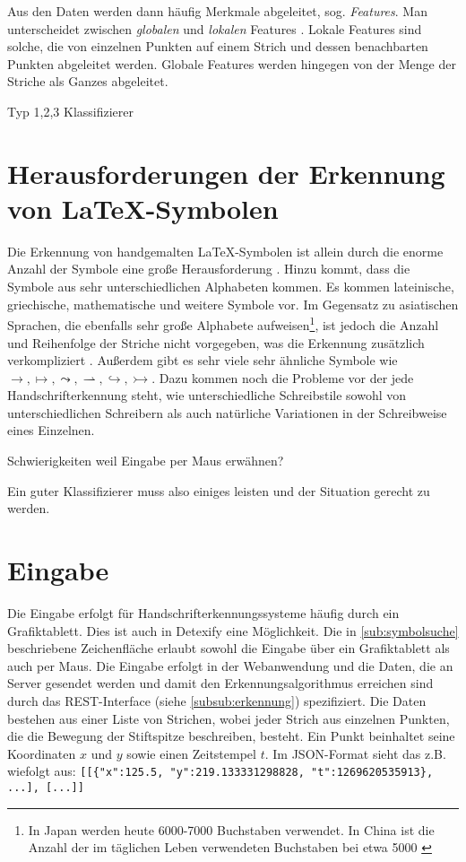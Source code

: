 Aus den Daten werden dann häufig Merkmale abgeleitet, sog. \emph{Features}. Man unterscheidet zwischen \emph{globalen} und \emph{lokalen} Features \cite{Tapia:2007p9160}. Lokale Features sind solche, die von einzelnen Punkten auf einem Strich und dessen benachbarten Punkten abgeleitet werden. Globale Features werden hingegen von der Menge der Striche als Ganzes abgeleitet.

\TODO Typ 1,2,3 Klassifizierer

\section[Herausforderungen]{Herausforderungen der Erkennung von \LaTeX-Symbolen}
Die Erkennung von handgemalten \LaTeX-Symbolen ist allein durch die enorme Anzahl der Symbole eine große Herausforderung \cite{Koerich:2003p1562}. Hinzu kommt, dass die Symbole aus sehr unterschiedlichen Alphabeten kommen. Es kommen lateinische, griechische, mathematische und weitere Symbole vor. Im Gegensatz zu asiatischen Sprachen, die ebenfalls sehr große Alphabete aufweisen\footnote{In Japan werden heute 6000-7000 Buchstaben verwendet. In China ist die Anzahl der im täglichen Leben verwendeten Buchstaben bei etwa 5000 \cite{Jaeger:2003p1097}}, ist jedoch die Anzahl und Reihenfolge der Striche nicht vorgegeben, was die Erkennung zusätzlich verkompliziert \cite{Watt:2005p1816}. Außerdem gibt es sehr viele sehr ähnliche Symbole wie $\rightarrow,\mapsto,\leadsto,\rightharpoonup,\hookrightarrow,\rightarrowtail$. Dazu kommen noch die Probleme vor der jede Handschrifterkennung steht, wie unterschiedliche Schreibstile sowohl von unterschiedlichen Schreibern als auch natürliche Variationen in der Schreibweise eines Einzelnen.

\TODO Schwierigkeiten weil Eingabe per Maus erwähnen?

Ein guter Klassifizierer muss also einiges leisten und der Situation gerecht zu werden.

\section{Eingabe}
\label{sec:input}

Die Eingabe erfolgt für Handschrifterkennungssysteme häufig durch ein Grafiktablett. Dies ist auch in Detexify eine Möglichkeit. Die in \ref{sub:symbolsuche} beschriebene Zeichenfläche erlaubt sowohl die Eingabe über ein Grafiktablett als auch per Maus. Die Eingabe erfolgt in der Webanwendung und die Daten, die an Server gesendet werden und damit den Erkennungsalgorithmus erreichen sind durch das \ac{REST}-Interface (siehe \ref{subsub:erkennung}) spezifiziert. Die Daten bestehen aus einer Liste von Strichen, wobei jeder Strich aus einzelnen Punkten, die die Bewegung der Stiftspitze beschreiben, besteht. Ein Punkt beinhaltet seine Koordinaten $x$ und $y$ sowie einen Zeitstempel $t$. Im \ac{JSON}-Format sieht das z.B. wiefolgt aus: \lstinline![[{"x":125.5, "y":219.133331298828, "t":1269620535913}, ...], [...]]!


